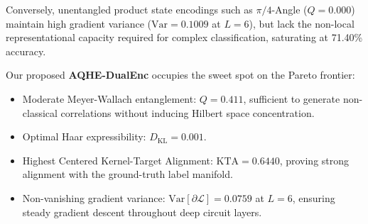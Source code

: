 \documentclass[10pt,twocolumn,twoside,a4paper]{article}
\begin{document}
Conversely, unentangled product state encodings such as $\pi/4$-Angle ($Q = 0.000$) maintain high gradient variance ($\text{Var} = 0.1009$ at $L=6$), but lack the non-local representational capacity required for complex classification, saturating at 71.40\% accuracy.

Our proposed \textbf{AQHE-DualEnc} occupies the sweet spot on the Pareto frontier:
\begin{itemize}
    \item Moderate Meyer-Wallach entanglement: $Q = 0.411$, sufficient to generate non-classical correlations without inducing Hilbert space concentration.
    \item Optimal Haar expressibility: $D_{\text{KL}} = 0.001$.
    \item Highest Centered Kernel-Target Alignment: $\text{KTA} = \mathbf{0.6440}$, proving strong alignment with the ground-truth label manifold.
    \item Non-vanishing gradient variance: $\text{Var}[\partial \mathcal{L}] = 0.0759$ at $L=6$, ensuring steady gradient descent throughout deep circuit layers.
\end{itemize}
\end{document}
